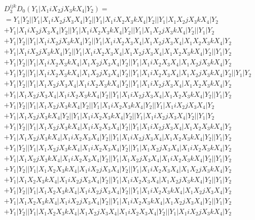 \documentclass{article}[12pt]
\begin{document}
\begin{align*}
& D_3^{ijk}D_0(Y_1|X_1iX_2jX_3kX_4|Y_2) =\\
& =Y_1|Y_2||Y_1|X_1iX_2jX_3X_4|Y_2||Y_1|X_1iX_2X_3kX_4|Y_2||Y_1|X_1X_2jX_3kX_4|Y_2\\ 
& +Y_1|X_1iX_2jX_3X_4|Y_2||Y_1|X_1iX_2X_3kX_4|Y_2||Y_1|X_1X_2jX_3kX_4|Y_2||Y_1|Y_2\\ 
 & + Y_1|Y_2||Y_1|X_1iX_2jX_3kX_4|Y_2||Y_1|X_1iX_2X_3X_4|X_1X_2jX_3X_4|X_1X_2X_3kX_4|Y_2\\ 
 & + Y_1|X_1iX_2jX_3kX_4|Y_2||Y_1|X_1iX_2X_3X_4|X_1X_2jX_3X_4|X_1X_2X_3kX_4|Y_2||Y_1|Y_2\\ 
 & + Y_1|Y_2||Y_1|X_1iX_2X_3kX_4|X_1X_2jX_3X_4|Y_2||Y_1|X_1iX_2X_3X_4|X_1X_2jX_3kX_4|Y_2\\
  & + Y_1|Y_2||Y_1|X_1iX_2X_3kX_4|X_1X_2jX_3X_4|Y_2||Y_1|X_1iX_2X_3X_4|X_1X_2jX_3kX_4|Y_2||Y_1|Y_2\\  
  & + Y_1|Y_2||Y_1|X_1X_2jX_3X_4|X_1iX_2X_3kX_4|Y_2||Y_1|X_1iX_2jX_3X_4|X_1X_2X_3kX_4|Y_2\\
   & + Y_1|X_1X_2jX_3X_4|X_1iX_2X_3kX_4|Y_2||Y_1|X_1iX_2jX_3X_4|X_1X_2X_3kX_4|Y_2||Y_1|Y_2\\ 
 & + Y_1|Y_2||Y_1|X_1X_2jX_3kX_4|Y_2||Y_1|X_1iX_2X_3kX_4|Y_2||Y_1|X_1iX_2jX_3X_4|Y_2\\
  & + Y_1|X_1X_2jX_3kX_4|Y_2||Y_1|X_1iX_2X_3kX_4|Y_2||Y_1|X_1iX_2jX_3X_4|Y_2||Y_1|Y_2\\ 
 & + Y_1|Y_2||Y_1|X_1X_2jX_3kX_4|X_1iX_2X_3X_4|Y_2||Y_1|X_1iX_2jX_3X_4|X_1X_2X_3kX_4|Y_2\\ 
  & + Y_1|X_1X_2jX_3kX_4|X_1iX_2X_3X_4|Y_2||Y_1|X_1iX_2jX_3X_4|X_1X_2X_3kX_4|Y_2||Y_1|Y_2\\ 
 & + Y_1|Y_2||Y_1|X_1X_2jX_3kX_4|X_1iX_2X_3X_4|Y_2||Y_1|X_1X_2jX_3X_4|X_1iX_2X_3kX_4|Y_2\\ 
  & + Y_1|X_1X_2jX_3kX_4|X_1iX_2X_3X_4|Y_2||Y_1|X_1X_2jX_3X_4|X_1iX_2X_3kX_4|Y_2||Y_1|Y_2\\ 
 & + Y_1|Y_2||Y_1|X_1X_2X_3kX_4|X_1iX_2jX_3X_4|Y_2||Y_1|X_1iX_2X_3X_4|X_1X_2jX_3kX_4|Y_2\\ 
  & + Y_1|X_1X_2X_3kX_4|X_1iX_2jX_3X_4|Y_2||Y_1|X_1iX_2X_3X_4|X_1X_2jX_3kX_4|Y_2||Y_1|Y_2\\
 & + Y_1|Y_2||Y_1|X_1X_2X_3kX_4|X_1iX_2jX_3X_4|Y_2||Y_1|X_1iX_2X_3kX_4|X_1X_2jX_3X_4|Y_2\\ 
  & + Y_1|X_1X_2X_3kX_4|X_1iX_2jX_3X_4|Y_2||Y_1|X_1iX_2X_3kX_4|X_1X_2jX_3X_4|Y_2||Y_1|Y_2\\ 
  & + Y_1|Y_2||Y_1|X_1X_2X_3kX_4|X_1X_2jX_3X_4|X_1iX_2X_3X_4|Y_2||Y_1|X_1iX_2jX_3kX_4|Y_2\\ 

\end{align*}
\end{document}
